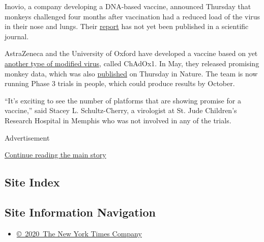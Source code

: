 Inovio, a company developing a DNA-based vaccine, announced Thursday
that monkeys challenged four months after vaccination had a reduced load
of the virus in their nose and lungs. Their
\href{https://www.biorxiv.org/content/10.1101/2020.07.28.225649v1}{report}
has not yet been published in a scientific journal.

AstraZeneca and the University of Oxford have developed a vaccine based
on yet
\href{https://www.nytimes.com/2020/07/20/world/covid-coronavirus-vaccine.html}{another
type of modified virus}, called ChAdOx1. In May, they released promising
monkey data, which was also
\href{https://www.nature.com/articles/s41586-020-2608-y}{published} on
Thursday in Nature. The team is now running Phase 3 trials in people,
which could produce results by October.

``It's exciting to see the number of platforms that are showing promise
for a vaccine,'' said Stacey L. Schultz-Cherry, a virologist at St. Jude
Children's Research Hospital in Memphis who was not involved in any of
the trials.

Advertisement

\protect\hyperlink{after-bottom}{Continue reading the main story}

\hypertarget{site-index}{%
\subsection{Site Index}\label{site-index}}

\hypertarget{site-information-navigation}{%
\subsection{Site Information
Navigation}\label{site-information-navigation}}

\begin{itemize}
\tightlist
\item
  \href{https://help.nytimes.com/hc/en-us/articles/115014792127-Copyright-notice}{©~2020~The
  New York Times Company}
\end{itemize}

